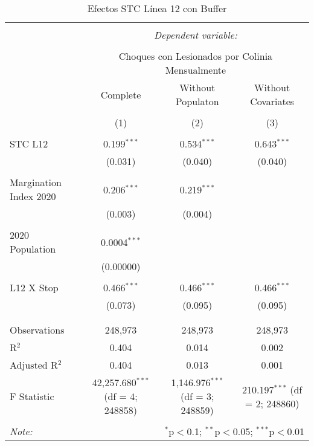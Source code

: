 
\begin{table}[!htbp] \centering 
  \caption{Efectos STC Línea 12 con Buffer} 
  \label{} 
\begin{tabular}{@{\extracolsep{5pt}}lccc} 
\\[-1.8ex]\hline 
\hline \\[-1.8ex] 
 & \multicolumn{3}{c}{\textit{Dependent variable:}} \\ 
\cline{2-4} 
\\[-1.8ex] & \multicolumn{3}{c}{Choques con Lesionados por Colinia Mensualmente} \\ 
 & Complete & Without Populaton & Without Covariates \\ 
\\[-1.8ex] & (1) & (2) & (3)\\ 
\hline \\[-1.8ex] 
 STC L12 & 0.199$^{***}$ & 0.534$^{***}$ & 0.643$^{***}$ \\ 
  & (0.031) & (0.040) & (0.040) \\ 
  & & & \\ 
 Margination Index 2020 & 0.206$^{***}$ & 0.219$^{***}$ &  \\ 
  & (0.003) & (0.004) &  \\ 
  & & & \\ 
 2020 Population & 0.0004$^{***}$ &  &  \\ 
  & (0.00000) &  &  \\ 
  & & & \\ 
 L12 X Stop & 0.466$^{***}$ & 0.466$^{***}$ & 0.466$^{***}$ \\ 
  & (0.073) & (0.095) & (0.095) \\ 
  & & & \\ 
\hline \\[-1.8ex] 
Observations & 248,973 & 248,973 & 248,973 \\ 
R$^{2}$ & 0.404 & 0.014 & 0.002 \\ 
Adjusted R$^{2}$ & 0.404 & 0.013 & 0.001 \\ 
F Statistic & 42,257.680$^{***}$ (df = 4; 248858) & 1,146.976$^{***}$ (df = 3; 248859) & 210.197$^{***}$ (df = 2; 248860) \\ 
\hline 
\hline \\[-1.8ex] 
\textit{Note:}  & \multicolumn{3}{r}{$^{*}$p$<$0.1; $^{**}$p$<$0.05; $^{***}$p$<$0.01} \\ 
\end{tabular} 
\end{table} 
